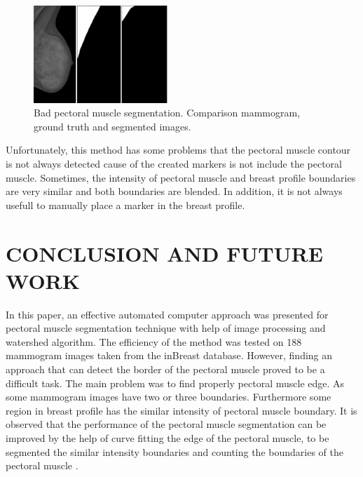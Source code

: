 \documentclass{article}
\begin{document}
 \begin{figure}[h!]
    \centering
    \includegraphics[width=0.45\textwidth]{images/bad_segment.jpg} 
    \caption{Bad pectoral muscle segmentation. Comparison mammogram, ground truth and segmented images.}
    \label{fig:bad_segment}
\end{figure} 

Unfortunately, this method has some problems that the pectoral muscle contour is not always detected cause of the created markers is not include the pectoral muscle. Sometimes, the intensity of pectoral muscle and breast profile boundaries are very similar and both boundaries are blended. In addition, it is not always usefull to manually place a marker in the breast profile.



\section{CONCLUSION AND FUTURE WORK}
\label{sec:conclusion}

In this paper, an effective automated computer approach was presented for pectoral muscle segmentation technique with help of image processing and watershed algorithm. The efficiency of the method was tested on 188 mammogram images  taken from the inBreast database. However, finding an approach that can detect the border of the pectoral muscle  proved to be a difficult task. The main problem was to find properly pectoral muscle edge. As some mammogram images have two or three boundaries. Furthermore some region in breast profile has the similar intensity of pectoral muscle boundary. It is observed that the performance of the pectoral muscle segmentation can be improved by the help of curve fitting the edge of the pectoral muscle, to be segmented the similar intensity boundaries and counting the boundaries of the pectoral muscle \cite{7}.
\end{document}
